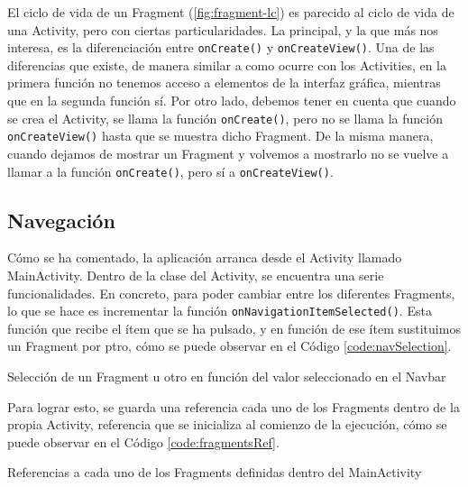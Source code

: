 El ciclo de vida de un Fragment (\autoref{fig:fragment-lc}) es parecido al ciclo de vida de una Activity, pero con ciertas particularidades. La principal, y la que más nos interesa, es la diferenciación entre \texttt{onCreate()} y \texttt{onCreateView()}. Una de las diferencias que existe, de manera similar a como ocurre con los Activities, en la primera función no tenemos acceso a elementos de la interfaz gráfica, mientras que en la segunda función sí. Por otro lado, debemos tener en cuenta que cuando se crea el Activity, se llama la función \texttt{onCreate()}, pero no se llama la función \texttt{onCreateView()} hasta que se muestra dicho Fragment. De la misma manera, cuando dejamos de mostrar un Fragment y volvemos a mostrarlo no se vuelve a llamar a la función \texttt{onCreate()}, pero sí a \texttt{onCreateView()}.

\subsection{Navegación}

Cómo se ha comentado, la aplicación arranca desde el Activity llamado MainActivity. Dentro de la clase del Activity, se encuentra una serie funcionalidades. En concreto, para poder cambiar entre los diferentes Fragments, lo que se hace es incrementar la función \texttt{onNavigationItemSelected()}. Esta función que recibe el ítem que se ha pulsado, y en función de ese ítem sustituimos un Fragment por ptro, cómo se puede observar en el Código \ref{code:navSelection}.

\begin{code}
	\caption{Selección de un Fragment u otro en función del valor seleccionado en el Navbar}
	\label{code:navSelection}
	
\end{code}

Para lograr esto, se guarda una referencia cada uno de los Fragments dentro de la propia Activity, referencia que se inicializa al comienzo de la ejecución, cómo se puede observar en el Código \ref{code:fragmentsRef}.

\begin{code}
	\caption{Referencias a cada uno de los Fragments definidas dentro del MainActivity}
	\label{code:fragmentsRef}
	
\end{code}


